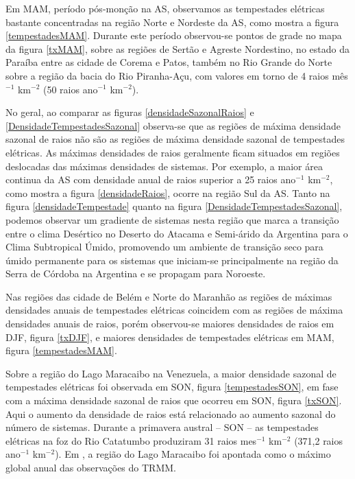 Em MAM, período pós-monção na AS, observamos as tempestades elétricas bastante concentradas na região Norte e Nordeste da AS, como mostra a figura \ref{tempestadesMAM}. Durante este período observou-se pontos de grade no mapa da figura \ref{txMAM}, sobre as regiões de Sertão e Agreste Nordestino, no estado da Paraíba entre as cidade de Corema e Patos, também no Rio Grande do Norte sobre a região da bacia do Rio Piranha-Açu, com valores em torno de 4 raios mês$^{-1}$ km$^{-2}$ (50 raios ano$^{-1}$ km$^{-2}$).



No geral, ao comparar as figuras \ref{densidadeSazonalRaios} e \ref{DensidadeTempestadesSazonal} observa-se que as regiões de máxima densidade sazonal de raios não são as regiões de máxima densidade sazonal de tempestades elétricas. As máximas densidades de raios geralmente ficam situados em regiões deslocadas das máximas densidades de sistemas. Por exemplo, a maior área continua da AS com densidade anual de raios superior a 25 raios ano$^{-1}$ km$^{-2}$, como mostra a figura \ref{densidadeRaios}, ocorre na região Sul da AS. Tanto na figura \ref{densidadeTempestade} quanto na figura \ref{DensidadeTempestadesSazonal}, podemos observar um  gradiente de sistemas nesta região que marca a transição entre o clima Desértico no Deserto do Atacama e Semi-árido da Argentina para o Clima Subtropical Úmido, promovendo um ambiente de transição seco para úmido permanente para os sistemas que iniciam-se principalmente na região da Serra de Córdoba na Argentina e se propagam para Noroeste.

Nas regiões das cidade de Belém e Norte do Maranhão as regiões de máximas densidades anuais de tempestades elétricas coincidem com as regiões de máxima densidades anuais de raios, porém observou-se maiores densidades de raios em DJF, figura \ref{txDJF}, e maiores densidades de tempestades elétricas em MAM, figura \ref{tempestadesMAM}. 

Sobre a região do Lago Maracaibo na Venezuela, a maior densidade sazonal de tempestades elétricas foi observada em SON, figura \ref{tempestadesSON}, em fase com a máxima densidade sazonal de raios que ocorreu em SON, figura \ref{txSON}. Aqui o aumento da densidade de raios está relacionado ao aumento sazonal do número de sistemas. Durante a primavera austral -- SON --  as tempestades elétricas na foz do Rio Catatumbo produziram 31 raios mes$^{-1}$ km$^{-2}$ (371,2 raios ano$^{-1}$ km$^{-2}$). Em , a região do Lago Maracaibo foi apontada como o máximo global anual das observações do TRMM. 

